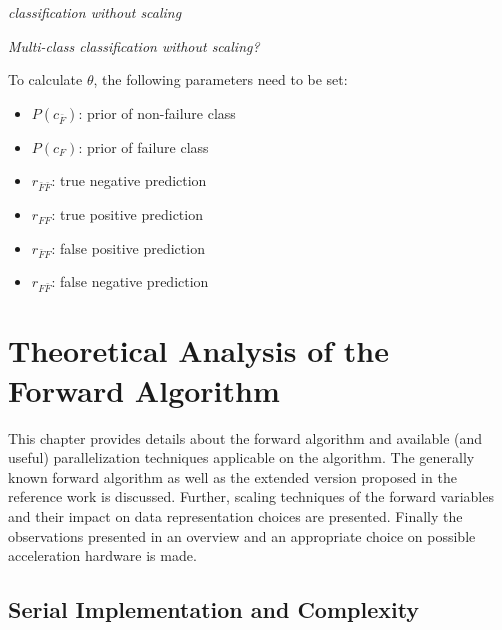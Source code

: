 \documentclass[mscthesis]{usiinfthesis}
\begin{document}
\emph{\color{red}classification without scaling}

\emph{\color{red}Multi-class classification without scaling?}

To calculate $ \theta $, the following parameters need to be set:
\begin{itemize}
    \item $ P(c_{\bar{F}}) $: prior of non-failure class
    \item $ P(c_F) $: prior of failure class
    \item $ r_{\bar{F}\bar{F}} $: true negative prediction
    \item $ r_{FF} $: true positive prediction
    \item $ r_{\bar{F}F} $: false positive prediction
    \item $ r_{F\bar{F}} $: false negative prediction
\end{itemize}

\chapter{Theoretical Analysis of the Forward Algorithm}
\label{ch:analysis}

This chapter provides details about the forward algorithm and available (and
useful) parallelization techniques applicable on the algorithm. The generally
known forward algorithm as well as the extended version proposed in the
reference work is discussed. Further, scaling techniques of the forward
variables and their impact on data representation choices are presented.
Finally the observations presented in an overview and an appropriate choice on
possible acceleration hardware is made.

\section{Serial Implementation and Complexity}
\label{ch:analysis_serial}
\end{document}
